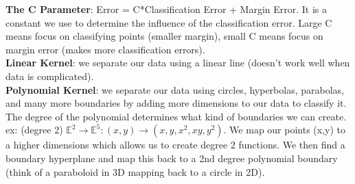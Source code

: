 \documentclass[11pt, a4paper]{article}
\begin{document}
\begin{spacing}{1.1}
	\textbf{The C Parameter}: Error = C*Classification Error + Margin Error. It is a constant we use to determine the influence of the classification error. Large C means focus on classifying points (smaller margin), small C means focus on margin error (makes more classification errors).\vspace*{2mm}\\
	\textbf{Linear Kernel}: we separate our data using a linear line (doesn't work well when data is complicated).\vspace*{2mm}\\
	\textbf{Polynomial Kernel}: we separate our data using circles, hyperbolas, parabolas, and many more boundaries by adding more dimensions to our data to classify it. The degree of the polynomial determines what kind of boundaries we can create.\vspace*{.5mm}\\
	ex: (degree 2) $\mathbb{E}^2 \rightarrow \mathbb{E}^5: (x,y) \rightarrow(x,y,x^2,xy,y^2)$. We map our points (x,y) to a higher dimensions which allows us to create degree 2 functions. We then find a boundary hyperplane and map this back to a 2nd degree polynomial boundary (think of a paraboloid in 3D mapping back to a circle in 2D). \vspace*{2mm}\\
	
	
	
	
	
	
	
	
	
\end{spacing}
\end{document}
